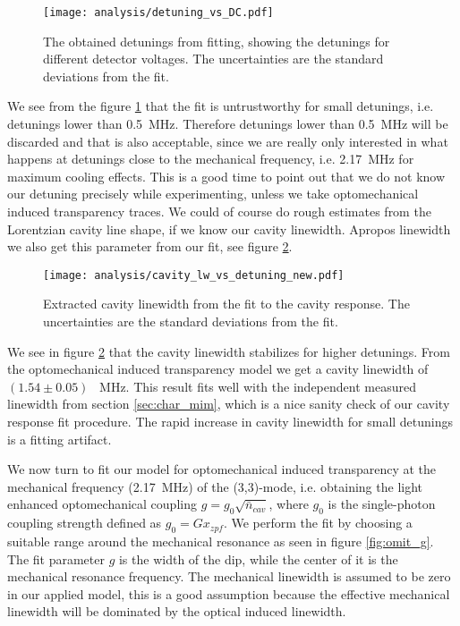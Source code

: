 \begin{figure}[H]
\centering
\texttt{[image: analysis/detuning\_vs\_DC.pdf]}
\caption{The obtained detunings from fitting, showing the detunings for different detector voltages. The uncertainties are the standard deviations from the fit.}
\label{fig:omit_detuning}
\end{figure}

We see from the figure \ref{fig:omit_detuning} that the fit is untrustworthy for small detunings, i.e. detunings lower than \SI{0.5}{\mega\hertz}. Therefore detunings lower than \SI{0.5}{\mega\hertz} will be discarded and that is also acceptable, since we are really only interested in what happens at detunings close to the mechanical frequency, i.e. \SI{2.17}{\mega\hertz} for maximum cooling effects. This is a good time to point out that we do not know our detuning precisely while experimenting, unless we take optomechanical induced transparency traces. We could of course do rough estimates from the Lorentzian cavity line shape, if we know our cavity linewidth. Apropos linewidth we also get this parameter from our fit, see figure \ref{fig:omit_cavity_lw}.

\begin{figure}[H]
\centering
\texttt{[image: analysis/cavity\_lw\_vs\_detuning\_new.pdf]}
\caption{Extracted cavity linewidth from the fit to the cavity response. The uncertainties are the standard deviations from the fit.}
\label{fig:omit_cavity_lw}
\end{figure}

We see in figure \ref{fig:omit_cavity_lw} that the cavity linewidth stabilizes for higher detunings. From the optomechanical induced transparency model we get a cavity linewidth of $(1.54 \pm 0.05)$ \SI{}{\mega\hertz}. This result fits well with the independent measured linewidth from section \ref{sec:char_mim}, which is a nice sanity check of our cavity response fit procedure. The rapid increase in cavity linewidth for small detunings is a fitting artifact.

We now turn to fit our model for optomechanical induced transparency at the mechanical frequency (\SI{2.17}{\mega\hertz}) of the (3,3)-mode, i.e. obtaining the light enhanced optomechanical coupling $g = g_0\sqrt{\bar{n}_{cav}}$, where $g_0$ is the single-photon coupling strength defined as $g_0 = Gx_{zpf}$. We perform the fit by choosing a suitable range around the mechanical resonance as seen in figure \ref{fig:omit_g}. The fit parameter $g$ is the width of the dip, while the center of it is the mechanical resonance frequency. The mechanical linewidth is assumed to be zero in our applied model, this is a good assumption because the effective mechanical linewidth will be dominated by the optical induced linewidth.

